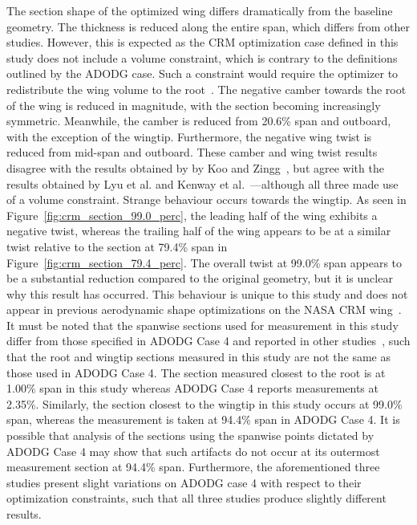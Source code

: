 The section shape of the optimized wing differs dramatically from the baseline geometry. The thickness is reduced along the entire span, which differs from other studies. However, this is expected as the CRM optimization case defined in this study does not include a volume constraint, which is contrary to the definitions outlined by the ADODG case. Such a constraint would require the optimizer to redistribute the wing volume to the root~\cite{koo_investigation_2018}. The negative camber towards the root of the wing is reduced in magnitude, with the section becoming increasingly symmetric. Meanwhile, the camber is reduced from 20.6\% span and outboard, with the exception of the wingtip. Furthermore, the negative wing twist is reduced from mid-span and outboard. These camber and wing twist results disagree with the results obtained by by Koo and Zingg~\cite{koo_investigation_2018}, but agree with the results obtained by Lyu et al. and Kenway et al.~\cite{lyu_aerodynamic_2015, kenway_multipoint_2015}—although all three made use of a volume constraint. 
Strange behaviour occurs towards the wingtip. As seen in Figure~\ref{fig:crm_section_99.0_perc}, the leading half of the wing exhibits a negative twist, whereas the trailing half of the wing appears to be at a similar twist relative to the section at 79.4\% span in Figure~\ref{fig:crm_section_79.4_perc}. The overall twist at 99.0\% span appears to be a substantial reduction compared to the original geometry, but it is unclear why this result has occurred. This behaviour is unique to this study and does not appear in previous aerodynamic shape optimizations on the NASA CRM wing~\cite{koo_investigation_2018, shi-dong_adjoint-based_2017, lyu_aerodynamic_2015, kenway_multipoint_2015}. It must be noted that the spanwise sections used for measurement in this study differ from those specified in ADODG Case 4 and reported in other studies~\cite{martins_aerodynamic_2022, koo_investigation_2018, shi-dong_adjoint-based_2017, lyu_aerodynamic_2015, kenway_multipoint_2015}, such that the root and wingtip sections measured in this study are not the same as those used in ADODG Case 4. The section measured closest to the root is at 1.00\% span in this study whereas ADODG Case 4 reports measurements at 2.35\%. Similarly, the section closest to the wingtip in this study occurs at 99.0\% span, whereas the measurement is taken at 94.4\% span in ADODG Case 4. It is possible that analysis of the sections using the spanwise points dictated by ADODG Case 4 may show that such artifacts do not occur at its outermost measurement section at 94.4\% span. Furthermore, the aforementioned three studies present slight variations on ADODG case 4 with respect to their optimization constraints, such that all three studies produce slightly different results.

